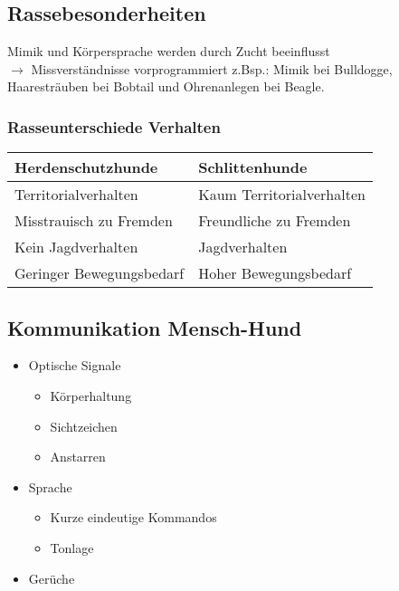     \subsection{Rassebesonderheiten}
        Mimik und Körpersprache werden durch Zucht beeinflusst \\
        $\rightarrow$ Missverständnisse vorprogrammiert z.Bsp.: Mimik bei Bulldogge, Haaresträuben bei Bobtail und Ohrenanlegen bei Beagle.

        \subsubsection{Rasseunterschiede Verhalten}
            \begin{tabular}{l|l}
                \textbf{Herdenschutzhunde} & \textbf{Schlittenhunde} \\
                \hline
                Territorialverhalten & Kaum Territorialverhalten \\
                Misstrauisch zu Fremden & Freundliche zu Fremden \\
                Kein Jagdverhalten & Jagdverhalten \\
                Geringer Bewegungsbedarf & Hoher Bewegungsbedarf \\
            \end{tabular}

    \subsection{Kommunikation Mensch-Hund}
        \begin{itemize}
            \item Optische Signale
            \begin{itemize}
                \item Körperhaltung
                \item Sichtzeichen
                \item Anstarren
            \end{itemize}
            \item Sprache
            \begin{itemize}
                \item Kurze eindeutige Kommandos
                \item Tonlage
            \end{itemize}
            \item Gerüche
        \end{itemize}


